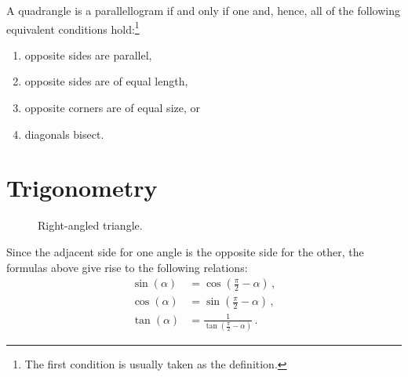    \begin{theorem}
        A quadrangle is a parallellogram if and only if one and, hence, all of the following equivalent conditions hold:\footnote{The first condition is usually taken as the definition.}
        \begin{enumerate}
            \item opposite sides are parallel,
            \item opposite sides are of equal length,
            \item opposite corners are of equal size, or
            \item diagonals bisect.
        \end{enumerate}
    \end{theorem}

\section{Trigonometry}

    \begin{figure}[ht!]
        \centering
        \caption{Right-angled triangle.}
        \label{fig:general_triangle}
    \end{figure}

    \begin{result}
        Since the adjacent side for one angle is the opposite side for the other, the formulas above give rise to the following relations:
        \begin{align}
            \sin(\alpha) &= \cos(\tfrac{\pi}{2}-\alpha)\,,\\
            \cos(\alpha) &= \sin(\tfrac{\pi}{2}-\alpha)\,,\\
            \tan(\alpha) &= \frac{1}{\tan(\tfrac{\pi}{2}-\alpha)}\,.
        \end{align}
    \end{result}
    
